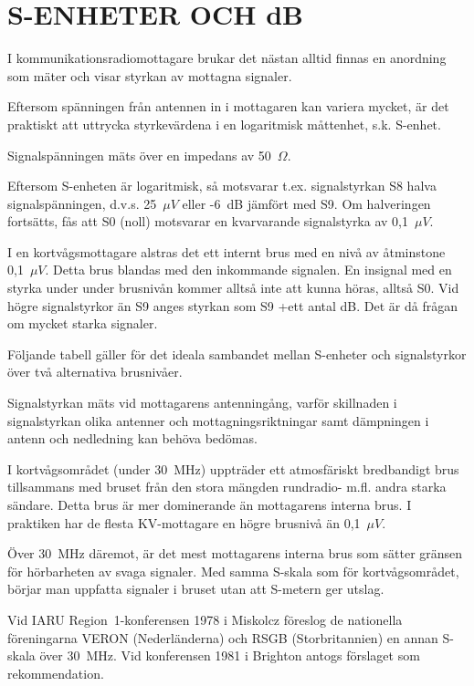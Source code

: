 \chapter{S-ENHETER OCH dB}
\label{s-enhet}

I kommunikationsradiomottagare brukar det nästan alltid finnas en
anordning som mäter och visar styrkan av mottagna signaler.

Eftersom spänningen från antennen in i mottagaren kan variera mycket,
är det praktiskt att uttrycka styrkevärdena i en logaritmisk måttenhet,
s.k. S-enhet.

Signalspänningen mäts över en impedans av 50~\(\Omega\).

Eftersom S-enheten är logaritmisk, så motsvarar t.ex. signalstyrkan
S8 halva signalspänningen, d.v.s. 25~\(\mu V\) eller -6~dB jämfört med S9. Om
halveringen fortsätts, fås att S0 (noll) motsvarar en kvarvarande
signalstyrka av 0,1~\(\mu V\).

I en kortvågsmottagare alstras det ett internt brus med en nivå av
åtminstone 0,1~\(\mu V\).  Detta brus blandas med den inkommande signalen. En
insignal med en styrka under under brusnivån kommer alltså inte att
kunna höras, alltså S0. Vid högre signalstyrkor än S9 anges styrkan
som S9 +ett antal dB. Det är då frågan om mycket starka signaler.

Följande tabell gäller för det ideala sambandet mellan S-enheter och
signalstyrkor över två alternativa brusnivåer.

Signalstyrkan mäts vid mottagarens antenningång, varför skillnaden i
signalstyrkan olika antenner och mottagningsriktningar samt dämpningen
i antenn och nedledning kan behöva bedömas.

I kortvågsområdet (under 30~MHz) uppträder ett atmosfäriskt
bredbandigt brus tillsammans med bruset från den stora mängden
rundradio- m.fl. andra starka sändare. Detta brus är mer dominerande
än mottagarens interna brus. I praktiken har de flesta KV-mottagare en
högre brusnivå än 0,1~\(\mu V\).

Över 30~MHz däremot, är det mest mottagarens interna brus som sätter
gränsen för hörbarheten av svaga signaler. Med samma S-skala som för
kortvågsområdet, börjar man uppfatta signaler i bruset utan att
S-metern ger utslag.

Vid IARU Region~1-konferensen 1978 i Miskolcz föreslog de nationella
föreningarna VERON (Nederländerna) och RSGB (Storbritannien) en annan
S-skala över 30~MHz.  Vid konferensen 1981 i Brighton antogs förslaget
som rekommendation.

